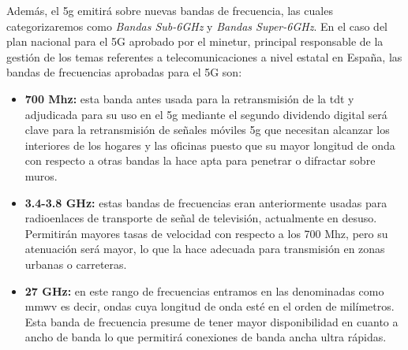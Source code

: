 \par Además, el \gls{5g} emitirá sobre nuevas bandas de frecuencia, las cuales categorizaremos como \textit{Bandas Sub-6GHz} y \textit{Bandas Super-6GHz}. En el caso del plan nacional para el 5G aprobado por el \gls{minetur}, principal responsable de la gestión de los temas referentes a telecomunicaciones a nivel estatal en España, las bandas de frecuencias aprobadas para el 5G son:
\\
\begin{itemize}
\item\textbf{700 Mhz:} esta banda antes usada para la retransmisión de la \gls{tdt} y adjudicada para su uso en el \gls{5g} mediante el segundo dividendo digital \cite{MINECO2019a} será clave para la retransmisión de señales móviles \gls{5g} que necesitan alcanzar los interiores de los hogares y las oficinas puesto que su mayor longitud de onda con respecto a otras bandas la hace apta para penetrar o difractar sobre muros.
\item\textbf{3.4-3.8 GHz: }estas bandas de frecuencias eran anteriormente usadas para radioenlaces de transporte de señal de televisión, actualmente en desuso. Permitirán mayores tasas de velocidad con respecto a los 700 Mhz, pero su atenuación será mayor, lo que la hace adecuada para transmisión en zonas urbanas o carreteras.
\item\textbf{27 GHz: }en este rango de frecuencias entramos en las denominadas como \gls{mmwv} es decir, ondas cuya longitud de onda esté en el orden de milímetros. Esta banda de frecuencia presume de tener mayor disponibilidad en cuanto a ancho de banda lo que permitirá conexiones de banda ancha ultra rápidas.
\end{itemize}

